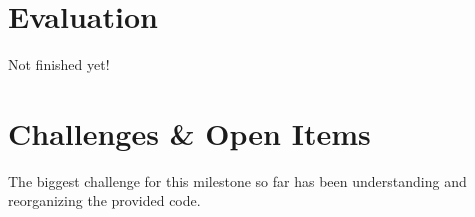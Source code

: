 \documentclass[12pt]{article}
\begin{document}
\section{Evaluation}
Not finished yet!

\section{Challenges \& Open Items}
The biggest challenge for this milestone so far has been understanding and reorganizing the provided code.
\end{document}
